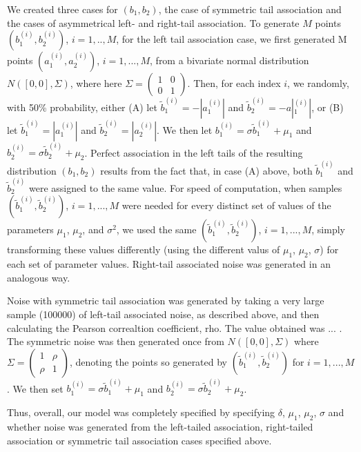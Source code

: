 \documentclass[letterpaper,11pt]{article}
\begin{document}
We created three cases for $(b_1,b_2)$, the case of symmetric tail association and the cases of asymmetrical left- and right-tail association. To generate $M$ points $(b_1^{(i)}, b_2^{(i)})$, $i=1,..,M$, for the left tail association case, we first generated M points $(a_1^{(i)},a_2^{(i)})$, $i=1,...,M$, from a bivariate normal distribution $N([0,0], \Sigma)$, where here $\Sigma = \begin{pmatrix} 1&0\\0&1\end{pmatrix}$. Then, for each index $i$, we randomly, with 50\% probability, either (A) let $\tilde b_1^{(i)} = -|a_1^{(i)}|$ and $\tilde b_2^{(i)} = -a|_1^{(i)}|$, or (B) let $\tilde b_1^{(i)} = |a_1^{(i)}|$ and $\tilde b_2^{(i)} = |a_2^{(i)}|$. We then let $b_1^{(i)} = \sigma \tilde b_1^{(i)} + \mu_1$ and $b_2^{(i)} = \sigma \tilde b_2^{(i)} + \mu_2$. Perfect association in the left tails of the resulting distribution $(b_1,b_2)$ results from the fact that, in case (A) above, both $\tilde b_1^{(i)}$ and $\tilde b_2^{(i)}$ were assigned to the same value. For speed of computation, when samples $(\tilde b_1^{(i)},\tilde b_2^{(i)})$, $i=1,...,M$ were needed for every distinct set of values of the parameters $\mu_1$, $\mu_2$, and $\sigma^2$, we used the same $(\tilde b_1^{(i)},\tilde b_2^{(i)})$, $i=1,...,M$, simply transforming these values differently (using the different valus of $\mu_1$, $\mu_2$, $\sigma$) for each set of parameter values. Right-tail associated noise was generated in an analogous way. 

Noise with symmetric tail association was generated by taking a very large sample (100000) of left-tail associated noise, as described above, and then calculating the Pearson correaltion coefficient, rho. The value obtained was ... . The symmetric noise was then generated once from $N([0,0], \Sigma)$ where $\Sigma = \begin{pmatrix} 1&\rho \\ \rho&1\end{pmatrix}$, denoting the points so generated by $(\tilde b_1^{(i)},\tilde b_2^{(i)})$ for $i=1,...,M$. We then set $b_1^{(i)} = \sigma \tilde b_1^{(i)} + \mu_1$ and $b_2^{(i)} = \sigma \tilde b_2^{(i)}+ \mu_2$.

Thus, overall, our model was completely specified by specifying $\delta$, $\mu_1$, $\mu_2$, $\sigma$ and whether noise was generated from the left-tailed association, right-tailed association or symmetric tail association cases specified above. 
\end{document}
